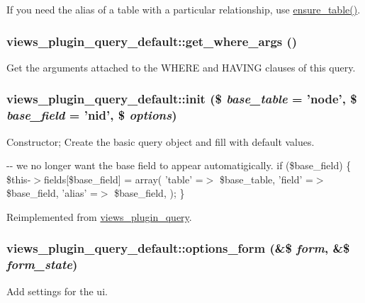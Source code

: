 If you need the alias of a table with a particular relationship, use \hyperlink{classviews__plugin__query__default_add3d47f9225b13269e9f51d9013d8970}{ensure\_\-table()}. \hypertarget{classviews__plugin__query__default_aefa64e1451878a790bb6e1ce589db28f}{
\subsubsection[{get\_\-where\_\-args}]{\setlength{\rightskip}{0pt plus 5cm}views\_\-plugin\_\-query\_\-default::get\_\-where\_\-args ()}}
\label{classviews__plugin__query__default_aefa64e1451878a790bb6e1ce589db28f}
Get the arguments attached to the WHERE and HAVING clauses of this query. \hypertarget{classviews__plugin__query__default_af724e9bdf8dc76ae3956c3ffa5b43d71}{
\subsubsection[{init}]{\setlength{\rightskip}{0pt plus 5cm}views\_\-plugin\_\-query\_\-default::init (\$ {\em base\_\-table} = {\ttfamily 'node'}, \/  \$ {\em base\_\-field} = {\ttfamily 'nid'}, \/  \$ {\em options})}}
\label{classviews__plugin__query__default_af724e9bdf8dc76ae3956c3ffa5b43d71}
Constructor; Create the basic query object and fill with default values. 

-\/-\/ we no longer want the base field to appear automatigically. if (\$base\_\-field) \{ \$this-\/$>$fields\mbox{[}\$base\_\-field\mbox{]} = array( 'table' =$>$ \$base\_\-table, 'field' =$>$ \$base\_\-field, 'alias' =$>$ \$base\_\-field, ); \}

Reimplemented from \hyperlink{classviews__plugin__query_a56239b387c0634fde577cbb355abff9d}{views\_\-plugin\_\-query}.\hypertarget{classviews__plugin__query__default_ab34cb54bf886643b1d16dc73f8ff78dc}{
\subsubsection[{options\_\-form}]{\setlength{\rightskip}{0pt plus 5cm}views\_\-plugin\_\-query\_\-default::options\_\-form (\&\$ {\em form}, \/  \&\$ {\em form\_\-state})}}
\label{classviews__plugin__query__default_ab34cb54bf886643b1d16dc73f8ff78dc}
Add settings for the ui. 

